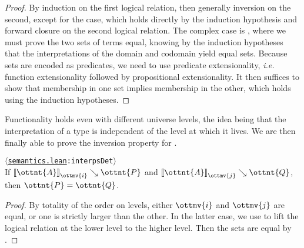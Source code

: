 \documentclass[a4paper,UKenglish,cleveref,autoref,thm-restate]{lipics-v2021}
\makeatletter
\newcommand{\repo}{https://github.com/ionathanch/TTBFL}
\newcommand{\ie}{\textit{i.e.}\@\xspace}
\newcommand{\thmref}[2]{%
  $\langle$\href{\repo/tree/main/src/#1}{\texttt{#1}}\texttt{:#2}$\rangle$%
}
\makeatother
\begin{document}
\begin{proof}
  By induction on the first logical relation,
  then generally inversion on the second,
  except for the  case,
  which holds directly by the induction hypothesis
  and forward closure on the second logical relation.
  The complex case is ,
  where we must prove the two sets of terms equal,
  knowing by the induction hypotheses
  that the interpretations of the domain and codomain yield equal sets.
  Because sets are encoded as predicates,
  we need to use predicate extensionality,
  \ie function extensionality followed by propositional extensionality.
  It then suffices to show that membership in one set implies membership in the other,
  which holds using the induction hypotheses.
\end{proof}

Functionality holds even with different universe levels,
the idea being that the interpretation of a type is independent
of the level at which it lives.
We are then finally able to prove the inversion property for .

\begin{lemma}[Functionality (l.r.)] \thmref{semantics.lean}{interpsDet} \label{lem:lr:func} \\
  If $ \mathopen{\llbracket}  \ottnt{A}  \mathclose{\rrbracket}_{ \ottmv{i} } \searrow  \ottnt{P} $ and $ \mathopen{\llbracket}  \ottnt{A}  \mathclose{\rrbracket}_{ \ottmv{j} } \searrow  \ottnt{Q} $, then $\ottnt{P} = \ottnt{Q}$.
\end{lemma}

\begin{proof}
  By totality of the order on levels,
  either $\ottmv{i}$ and $\ottmv{j}$ are equal,
  or one is strictly larger than the other.
  In the latter case,
  we use  to lift the logical relation at the lower level to the higher level.
  Then the sets are equal by .
\end{proof}
\end{document}
